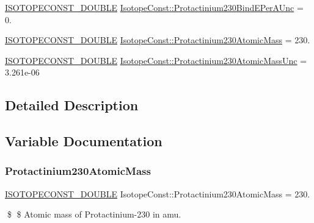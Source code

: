 \begin{DoxyCompactItemize}
\item 
\mbox{\hyperlink{group___isotope_const-_macros_ga8f45a7272ce02c0b4c65c44636ed719a}{I\+S\+O\+T\+O\+P\+E\+C\+O\+N\+S\+T\+\_\+\+D\+O\+U\+B\+LE}} \mbox{\hyperlink{group___isotope_const-_protactinium-_pa230_gad38656a527ac3e634ab594f5b35f324f}{Isotope\+Const\+::\+Protactinium230\+Bind\+E\+Per\+A\+Unc}} = 0.
\item 
\mbox{\hyperlink{group___isotope_const-_macros_ga8f45a7272ce02c0b4c65c44636ed719a}{I\+S\+O\+T\+O\+P\+E\+C\+O\+N\+S\+T\+\_\+\+D\+O\+U\+B\+LE}} \mbox{\hyperlink{group___isotope_const-_protactinium-_pa230_ga61f0e1508918008e53847c0de8d0dcb2}{Isotope\+Const\+::\+Protactinium230\+Atomic\+Mass}} = 230.
\item 
\mbox{\hyperlink{group___isotope_const-_macros_ga8f45a7272ce02c0b4c65c44636ed719a}{I\+S\+O\+T\+O\+P\+E\+C\+O\+N\+S\+T\+\_\+\+D\+O\+U\+B\+LE}} \mbox{\hyperlink{group___isotope_const-_protactinium-_pa230_gae0b5c6ea6d648aeb1bd469aea32b2883}{Isotope\+Const\+::\+Protactinium230\+Atomic\+Mass\+Unc}} = 3.\+261e-\/06
\end{DoxyCompactItemize}


\subsection{Detailed Description}


\subsection{Variable Documentation}
\mbox{\label{group___isotope_const-_protactinium-_pa230_ga61f0e1508918008e53847c0de8d0dcb2}} 
\subsubsection{\texorpdfstring{Protactinium230\+Atomic\+Mass}{Protactinium230AtomicMass}}
{\footnotesize\ttfamily \mbox{\hyperlink{group___isotope_const-_macros_ga8f45a7272ce02c0b4c65c44636ed719a}{I\+S\+O\+T\+O\+P\+E\+C\+O\+N\+S\+T\+\_\+\+D\+O\+U\+B\+LE}} Isotope\+Const\+::\+Protactinium230\+Atomic\+Mass = 230.}

\$ \$ Atomic mass of Protactinium-\/230 in amu. \mbox{\label{group___isotope_const-_protactinium-_pa230_gae0b5c6ea6d648aeb1bd469aea32b2883}} 
